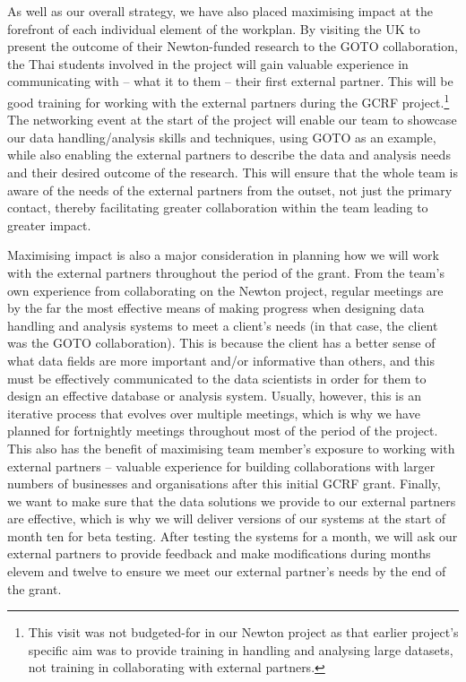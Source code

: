 \documentclass[11pt]{article}
\begin{document}
  \vspace{2mm}
  \noindent
  As well as our overall strategy, we have also placed maximising impact at the forefront of each individual element of the workplan. By visiting the UK to present the outcome of their Newton-funded research to the GOTO collaboration, the Thai students involved in the project will gain valuable experience in communicating with -- what it to them -- their first external partner. This will be good training for working with the external partners during the GCRF project.\footnote{This visit was not budgeted-for in our Newton project as that earlier project's specific aim was to provide training in handling and analysing large datasets, not training in collaborating with external partners.} The networking event at the start of the project will enable our team to showcase our data handling/analysis skills and techniques, using GOTO as an example, while also enabling the external partners to describe the data and analysis needs and their desired outcome of the research. This will ensure that the whole team is aware of the needs of the external partners from the outset, not just the primary contact, thereby facilitating greater collaboration within the team leading to greater impact.
  
  \vspace{2mm}
  \noindent
  Maximising impact is also a major consideration in planning how we will work with the external partners throughout the period of the grant. From the team's own experience from collaborating on the Newton project, regular meetings are by the far the most effective means of making progress when designing data handling and analysis systems to meet a client's needs (in that case, the client was the GOTO collaboration). This is because the client has a better sense of what data fields are more important and/or informative than others, and this must be effectively communicated to the data scientists in order for them to design an effective database or analysis system. Usually, however, this is an iterative process that evolves over multiple meetings, which is why we have planned for fortnightly meetings throughout most of the period of the project. This also has the benefit of maximising team member's exposure to working with external partners -- valuable experience for building collaborations with larger numbers of businesses and organisations after this initial GCRF grant. Finally, we want to make sure that the data solutions we provide to our external partners are effective, which is why we will deliver versions of our systems at the start of month ten for beta testing. After testing the systems for a month, we will ask our external partners to provide feedback and make modifications during months elevem and twelve to ensure we meet our external partner's needs by the end of the grant. 
  
\end{document}
